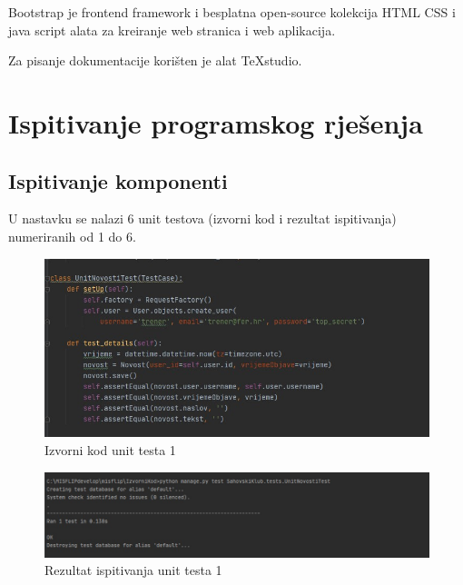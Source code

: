 			\noindent Bootstrap je frontend framework i besplatna open-source kolekcija HTML CSS i java script alata za kreiranje web stranica i web aplikacija.
			
			\noindent Za pisanje dokumentacije korišten je alat TeXstudio.
			
			
			
			\eject 
		
	
		\section{Ispitivanje programskog rješenja}
	
			
			\subsection{Ispitivanje komponenti}
			
		U nastavku se nalazi 6 unit testova (izvorni kod i rezultat ispitivanja) numeriranih od 1 do 6.
		
		\begin{figure}[H]
			\centerfloat
			\includegraphics[scale=0.55]{slike/unittest1izv.jpeg} %
			\caption{Izvorni kod unit testa 1}
			
		\end{figure}
	
	\begin{figure}[H]
		\centerfloat
		\includegraphics[scale=0.55]{slike/unittest1.jpeg} %
		\caption{Rezultat ispitivanja unit testa 1}
		
	\end{figure}

